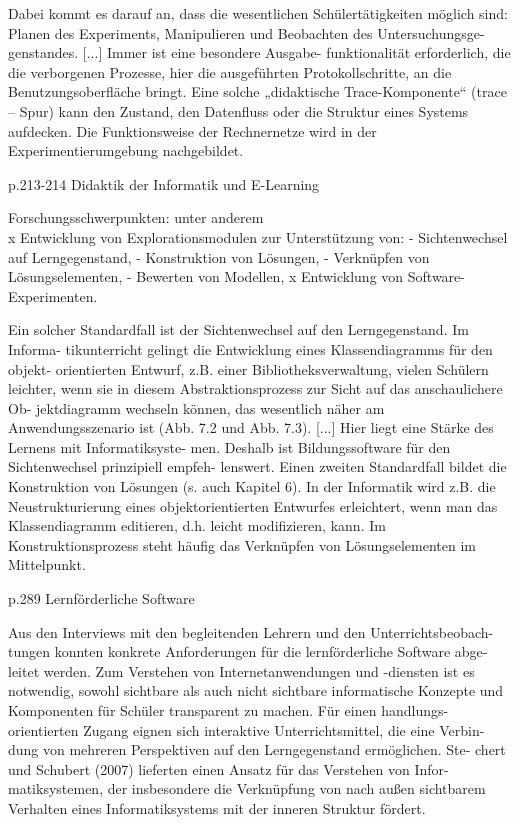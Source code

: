 Dabei  kommt  es  darauf  an,  dass  die  wesentlichen  Schülertätigkeiten  möglich 
sind: Planen des Experiments, Manipulieren und Beobachten des Untersuchungsge-
genstandes.  [...]  Immer  ist  eine  besondere  Ausgabe-
funktionalität erforderlich, die die verborgenen Prozesse, hier die ausgeführten 
Protokollschritte, an die Benutzungsoberfläche bringt. Eine solche „didaktische 
Trace-Komponente“ (trace – Spur) kann den Zustand, den Datenfluss oder die 
Struktur eines Systems aufdecken. Die Funktionsweise der Rechnernetze wird 
in der Experimentierumgebung nachgebildet.

p.213-214
Didaktik der Informatik und E-Learning 

Forschungsschwerpunkten: unter anderem\\
x Entwicklung von Explorationsmodulen zur Unterstützung von: 
- Sichtenwechsel auf Lerngegenstand, 
- Konstruktion von Lösungen, 
- Verknüpfen von Lösungselementen, 
- Bewerten von Modellen, 
x Entwicklung von Software-Experimenten. 

Ein solcher Standardfall ist der Sichtenwechsel auf den Lerngegenstand. Im Informa-
tikunterricht gelingt die Entwicklung eines Klassendiagramms für den objekt-
orientierten Entwurf, z.B. einer Bibliotheksverwaltung, vielen Schülern leichter, 
wenn sie in diesem Abstraktionsprozess zur Sicht auf das anschaulichere Ob-
jektdiagramm wechseln können, das wesentlich näher am Anwendungsszenario 
ist (Abb. 7.2 und Abb. 7.3). [...] Hier liegt eine Stärke des Lernens mit Informatiksyste-
men. Deshalb ist Bildungssoftware für den Sichtenwechsel prinzipiell empfeh-
lenswert. 
Einen zweiten Standardfall bildet die Konstruktion von Lösungen (s. auch Kapitel 
6). In der Informatik wird z.B. die Neustrukturierung eines objektorientierten 
Entwurfes  erleichtert,  wenn  man  das  Klassendiagramm  editieren,  d.h.  leicht 
modifizieren,  kann.  Im  Konstruktionsprozess  steht  häufig  das  Verknüpfen  von 
Lösungselementen im Mittelpunkt. 

p.289
Lernförderliche Software 

Aus den Interviews mit den begleitenden Lehrern und den Unterrichtsbeobach-
tungen konnten konkrete Anforderungen für die lernförderliche Software abge-
leitet werden. Zum Verstehen von Internetanwendungen und -diensten ist es 
notwendig, sowohl sichtbare als auch nicht sichtbare informatische Konzepte 
und Komponenten für Schüler transparent zu machen. Für einen handlungs-
orientierten Zugang eignen sich interaktive Unterrichtsmittel, die eine Verbin-
dung  von  mehreren  Perspektiven  auf  den  Lerngegenstand  ermöglichen.  Ste-
chert und Schubert (2007) lieferten einen Ansatz für das Verstehen von Infor-
matiksystemen, der insbesondere die Verknüpfung von nach außen sichtbarem 
Verhalten eines Informatiksystems mit der inneren Struktur fördert.  


